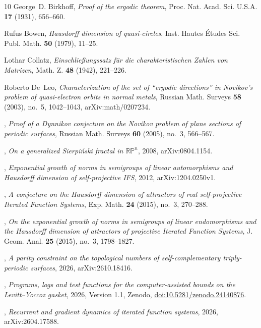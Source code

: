 \documentclass[11pt]{amsart}
\theoremstyle{definition}
\theoremstyle{remark}
\begin{document}
\begin{thebibliography}{10}
George~D. Birkhoff, \emph{Proof of the ergodic theorem}, Proc. Nat. Acad. Sci.
  U.S.A. \textbf{17} (1931), 656--660.

Rufus Bowen, \emph{Hausdorff dimension of quasi-circles}, Inst. Hautes
  {\'E}tudes Sci. Publ. Math. \textbf{50} (1979), 11--25.

Lothar Collatz, \emph{Einschlie{\ss}ungssatz f{\"u}r die charakteristischen
  {Z}ahlen von {M}atrizen}, Math. Z. \textbf{48} (1942), 221--226.

Roberto De~Leo, \emph{Characterization of the set of ``ergodic directions'' in
  {N}ovikov's problem of quasi-electron orbits in normal metals}, Russian Math.
  Surveys \textbf{58} (2003), no.~5, 1042--1043, arXiv:math/0207234.

\bysame, \emph{Proof of a {D}ynnikov conjecture on the {N}ovikov problem of
  plane sections of periodic surfaces}, Russian Math. Surveys \textbf{60}
  (2005), no.~3, 566--567.

\bysame, \emph{On a generalized {S}ierpi{\'n}ski fractal in $\mathbb{RP}^n$},
  2008, arXiv:0804.1154.

\bysame, \emph{Exponential growth of norms in semigroups of linear
  automorphisms and {H}ausdorff dimension of self-projective {IFS}}, 2012,
  arXiv:1204.0250v1.

\bysame, \emph{A conjecture on the {H}ausdorff dimension of attractors of real
  self-projective {I}terated {F}unction {S}ystems}, Exp. Math. \textbf{24}
  (2015), no.~3, 270--288.

\bysame, \emph{On the exponential growth of norms in semigroups of linear
  endomorphisms and the {H}ausdorff dimension of attractors of projective
  {I}terated {F}unction {S}ystems}, J. Geom. Anal. \textbf{25} (2015), no.~3,
  1798--1827.

\bysame, \emph{A parity constraint on the topological numbers of
  self-complementary triply-periodic surfaces}, 2026, arXiv:2610.18416.

\bysame, \emph{Programs, logs and test functions for the computer-assisted
  bounds on the {L}evitt--{Y}occoz gasket}, 2026, Version 1.1, Zenodo,
  \href{https://doi.org/10.5281/zenodo.24140876}{doi:10.5281/zenodo.24140876}.

\bysame, \emph{Recurrent and gradient dynamics of iterated function systems},
  2026, arXiv:2604.17588.


\end{thebibliography}
\end{document}
